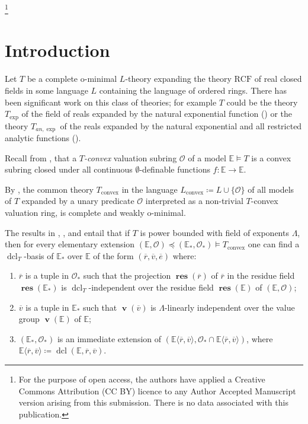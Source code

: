\documentclass{amsart}
\theoremstyle{remark}
\theoremstyle{definition}
\theoremstyle{plain}
\newcommand{\bE}{\mathbb E}
\newcommand{\cO}{\mathcal O}
\newcommand{\convex}{\mathrm{convex}}
\newcommand{\RCF}{\mathrm{RCF}}
\DeclareMathOperator{\val}{\mathbf{v}}
\DeclareMathOperator{\res}{\mathbf{res}}
\DeclareMathOperator{\dcl}{\mathrm{dcl}}
\theoremstyle{plain}
\newcommand\blfootnote[1]{%
  \begingroup
  \renewcommand\thefootnote{}\footnote{#1}%
  \addtocounter{footnote}{-1}%
  \endgroup
}
\begin{document}
\maketitle
\blfootnote{For the purpose of open access, the authors have applied a Creative Commons Attribution (CC BY) licence to any Author Accepted Manuscript version arising from this submission. There is no data associated with this publication.}

\section{Introduction}

Let $T$ be a complete o-minimal $L$-theory expanding the theory $\RCF$ of real closed fields in some language $L$ containing the language of ordered rings. There has been significant work on this class of theories; for example $T$ could be the theory $T_{\exp}$ of the field of reals expanded by the natural exponential function (\cite{wilkie1996model}) or the theory $T_{an, \exp}$ of the reals expanded by the natural exponential and all restricted analytic functions (\cite{dries1994real}).

Recall from \cite[(2.7)]{dries1995t}, that a \emph{$T$-convex} valuation subring $\cO$ of a model $\bE\models T$ is a convex subring closed under all continuous $\emptyset$-definable functions $f: \bE \to \bE$.

By \cite[(3.13) and (3.14)]{dries1995t}, the common theory $T_\convex$ in the language $L_\convex\coloneqq  L \cup \{\cO\}$ of all models of $T$ expanded by a unary predicate $\cO$ interpreted as a non-trivial $T$-convex valuation ring, is complete and weakly o-minimal.

The results in \cite[(2.12)]{dries1995t}, \cite[Thm.~B]{dries1997t}, and \cite[Ch.~12 and 13]{tyne2003t} entail that if $T$ is power bounded with field of exponents $\Lambda$, then for every elementary extension $(\bE, \cO) \preceq (\bE_*, \cO_*)\models T_\convex$ one can find a $\dcl_T$-basis of $\bE_*$ over $\bE$ of the form $(\overline{r}, \overline{v}, \overline{e})$ where:
\begin{enumerate}
    \item $\overline{r}$ is a tuple in $\cO_*$ such that the projection $\res(\overline{r})$ of $\overline{r}$ in the residue field $\res(\bE_*)$ is $\dcl_T$-independent over the residue field $\res(\bE)$ of $(\bE, \cO)$;
    \item $\overline{v}$ is a tuple in $\bE_*$ such that $\val(\overline{v})$ is $\Lambda$-linearly independent over the value group $\val(\bE)$ of $\bE$;
    \item $(\bE_*, \cO_*)$ is an immediate extension of $(\bE\langle \overline{r}, \overline{v}\rangle, \cO_*\cap \bE \langle \overline{r}, \overline{v}\rangle)$, where $\bE\langle \overline{r}, \overline{v}\rangle\coloneqq \dcl(\bE, \overline{r}, \overline{v})$.
\end{enumerate}
\end{document}
